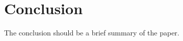 \section{Conclusion}
\label{sec:conclusion}

The conclusion should be a brief summary of the paper.
